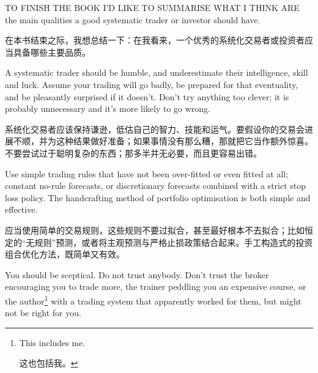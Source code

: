 
\begin{englishblock} TO FINISH THE BOOK I'D LIKE TO SUMMARISE WHAT I THINK ARE the main qualities a good systematic trader or investor should have. \end{englishblock}

\begin{chineseblock}在本书结束之际，我想总结一下：在我看来，一个优秀的系统化交易者或投资者应当具备哪些主要品质。\end{chineseblock}

\bipairgap

\begin{englishblock} A systematic trader should be humble, and underestimate their intelligence, skill and luck. Assume your trading will go badly, be prepared for that eventuality, and be pleasantly surprised if it doesn't. Don't try anything too clever; it is probably unnecessary and it's more likely to go wrong. \end{englishblock}

\begin{chineseblock}系统化交易者应该保持谦逊，低估自己的智力、技能和运气。要假设你的交易会进展不顺，并为这种结果做好准备；如果事情没有那么糟，那就把它当作额外惊喜。不要尝试过于聪明复杂的东西；那多半并无必要，而且更容易出错。\end{chineseblock}

\bipairgap

\begin{englishblock} Use simple trading rules that have not been over-fitted or even fitted at all; constant no-rule forecasts, or discretionary forecasts combined with a strict stop loss policy. The handcrafting method of portfolio optimisation is both simple and effective. \end{englishblock}

\begin{chineseblock}应当使用简单的交易规则，这些规则不要过拟合，甚至最好根本不去拟合；比如恒定的“无规则”预测，或者将主观预测与严格止损政策结合起来。手工构造式的投资组合优化方法，既简单又有效。\end{chineseblock}

\bipairgap

\begin{englishblock} You should be sceptical. Do not trust anybody. Don't trust the broker encouraging you to trade more, the trainer peddling you an expensive course, or the author\footnote{This includes me. \par 这也包括我。} with a trading system that apparently worked for them, but might not be right for you. \end{englishblock}


